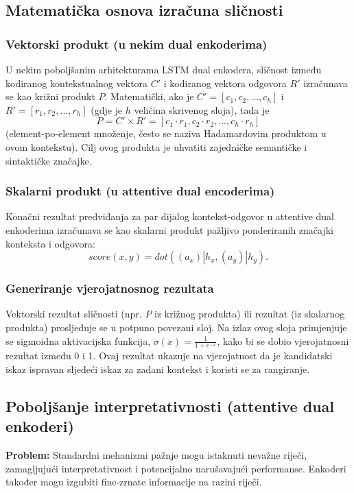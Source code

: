 \subsection{Matematička osnova izračuna sličnosti}
\subsubsection{Vektorski produkt (u nekim dual enkoderima)}
U nekim poboljšanim arhitekturama LSTM dual enkodera, sličnost između kodiranog kontekstualnog vektora $C'$ i kodiranog vektora odgovora $R'$ izračunava se kao križni produkt $P$. Matematički, ako je $C' = [c_1, c_2,..., c_h]$ i $R' = [r_1, r_2,..., r_h]$ (gdje je $h$ veličina skrivenog sloja), tada je $$P = C' \times R' = [c_1 \cdot r_1, c_2 \cdot r_2,..., c_h \cdot r_h]$$ (element-po-element množenje, često se naziva Hadamardovim produktom u ovom kontekstu). Cilj ovog produkta je uhvatiti zajedničke semantičke i sintaktičke značajke.

\subsubsection{Skalarni produkt (u attentive dual encoderima)}
Konačni rezultat predviđanja za par dijalog kontekst-odgovor u attentive dual enkoderima izračunava se kao skalarni produkt pažljivo ponderiranih značajki konteksta i odgovora: $$score(x, y) = dot((a_x)|h_x, (a_y)|h_y).$$

\subsubsection{Generiranje vjerojatnosnog rezultata} Vektorski rezultat sličnosti (npr. $P$ iz križnog produkta) ili rezultat (iz skalarnog produkta) prosljeđuje se u potpuno povezani sloj. Na izlaz ovog sloja primjenjuje se sigmoidna aktivacijska funkcija, $\sigma(x) = \frac{1}{1 + e^{-x}}$, kako bi se dobio vjerojatnosni rezultat između 0 i 1. Ovaj rezultat ukazuje na vjerojatnost da je kandidatski iskaz ispravan sljedeći iskaz za zadani kontekst i koristi se za rangiranje.

\subsection{Poboljšanje interpretativnosti (attentive dual enkoderi)}
\textbf{Problem:} Standardni mehanizmi pažnje mogu istaknuti nevažne riječi, zamagljujući interpretativnost i potencijalno narušavajući performanse. Enkoderi također mogu izgubiti fine-zrnate informacije na razini riječi.

